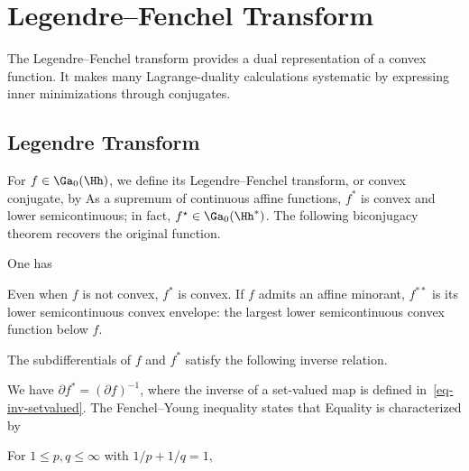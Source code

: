 \section{Legendre--Fenchel Transform}

The Legendre--Fenchel transform provides a dual representation of a convex function. It makes many Lagrange-duality calculations systematic by expressing inner minimizations through conjugates.

\subsection{Legendre Transform}

For $f \in \Ga_0(\Hh)$, we define its Legendre--Fenchel transform, or convex conjugate, by
As a supremum of continuous affine functions, $f^*$ is convex and lower semicontinuous; in fact, $f^\star \in \Ga_0(\Hh^*)$. The following biconjugacy theorem recovers the original function.

\begin{thm}
One has
\end{thm}

Even when $f$ is not convex, $f^*$ is convex. If $f$ admits an affine minorant, $f^{**}$ is its lower semicontinuous convex envelope: the largest lower semicontinuous convex function below $f$.


The subdifferentials of $f$ and $f^*$ satisfy the following inverse relation.

\begin{prop}
We have $\partial f^* = (\partial f)^{-1}$, where the inverse of a set-valued map is defined in~\eqref{eq-inv-setvalued}. The Fenchel--Young inequality states that
Equality is characterized by
\end{prop}

\begin{prop}\label{prop-dual-lp}
	For $1\leq p,q\leq\infty$ with $1/p+1/q=1$,
\end{prop}


